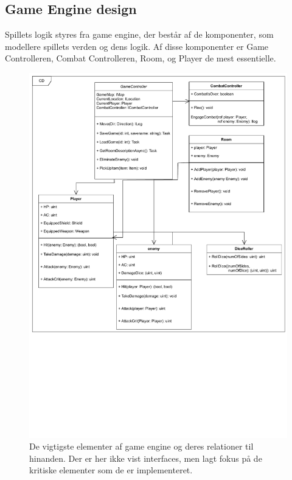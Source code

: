 \subsection{Game Engine design}
\label{sec:GameEngineDesign}

\noindent Spillets logik styres fra game engine, der består
af de komponenter, som modellere spillets verden og dens 
logik. Af disse komponenter er Game Controlleren, Combat Controlleren,
Room, og Player de mest essentielle.

\begin{figure}[H]
  \centering
  \includegraphics[width=\textwidth, trim = 0 9cm 0 0]{02-Body/Images/CoreClassDiagram.pdf}
  \caption{De vigtigste elementer af game engine og deres 
           relationer til hinanden. Der er her ikke vist 
           interfaces, men lagt fokus på de kritiske elementer
           som de er implementeret.}%
  \label{fig:CoreDiagram}
\end{figure}

